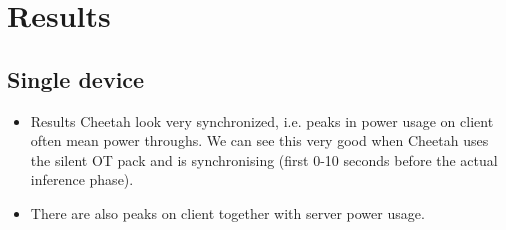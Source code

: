 \documentclass[../thesis.tex]{subfiles}
\begin{document}
\section{Results}
\subsection{Single device}
\begin{itemize}
        \item Results Cheetah look very synchronized, i.e. peaks in power usage on client often mean power throughs. We can see this very good when Cheetah uses the silent OT pack and is synchronising (first 0-10 seconds before the actual inference phase). 
        \item There are also peaks on client together with server power usage. 
\end{itemize}

     
     
     
\end{document}
